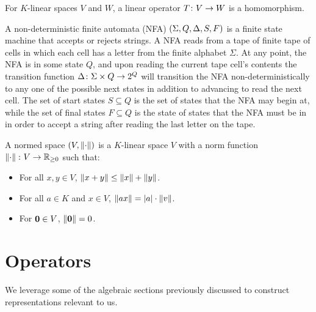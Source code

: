 \documentclass[12pt]{article}
\begin{document}
\begin{definition}
  For \(K\)-linear spaces \(V\) and \(W\), a linear operator
  \(T \colon V \to W\) is a homomorphism.
\end{definition}


\begin{definition}
  A non-deterministic finite automata (NFA)
  \(\left(\Sigma, Q, \Delta, S, F\right)\)
  is a finite state machine that accepts or rejects strings.
  A NFA reads from a tape of finite tape of cells in which each cell
  has a letter from the finite alphabet \(\Sigma\).
  At any point, the NFA is in some state \(Q\), and
  upon reading the current tape cell's contents
  the transition function \(\Delta \colon \Sigma \times Q \to 2^{Q}\)
  will transition the NFA non-deterministically to any one of
  the possible next states in addition to advancing to read the next cell.
  The set of start states \(S \subseteq Q\) is the set of states
  that the NFA may begin at,
  while the set of final states \(F \subseteq Q\) is the state of states
  that the NFA must be in in order to accept a string
  after reading the last letter on the tape.
\end{definition}


\begin{definition}[Norm]
  A normed space \(\left(V, \left\lVert\cdot\right\rVert\right)\) is a \(K\)-linear space \(V\)
  with a norm function \(\left\lVert\cdot\right\rVert \colon V \to \mathbb{R}_{\geq 0}\) such that:
  \begin{itemize}
    \item
      For all \(x, y \in V\), \(\left\lVert x + y\right\rVert \leq \left\lVert x\right\rVert + \left\lVert y\right\rVert\).

    \item
      For all \(a \in K\) and \(x \in V\),
      \(\left\lVert ax\right\rVert = \left\lvert a\right\rvert \cdot \left\lVert v\right\rVert\).

    \item
      For \(\mathbf{0} \in V\), \(\left\lVert\mathbf{0}\right\rVert = 0\).
  \end{itemize}
\end{definition}

\section{Operators}

We leverage some of the algebraic sections previously discussed to
construct representations relevant to us.
\end{document}
